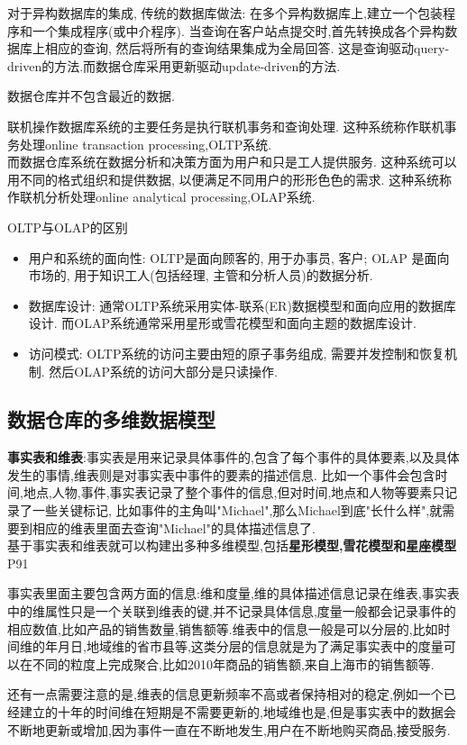 \documentclass{article}
\begin{document}
对于异构数据库的集成, 传统的数据库做法: 在多个异构数据库上,建立一个包装程序和一个集成程序(或中介程序). 当查询在客户站点提交时,首先转换成各个异构数据库上相应的查询, 然后将所有的查询结果集成为全局回答. 这是查询驱动query-driven的方法.而数据仓库采用更新驱动update-driven的方法.\par
数据仓库并不包含最近的数据.

联机操作数据库系统的主要任务是执行联机事务和查询处理. 这种系统称作联机事务处理online transaction processing,OLTP系统. \\
而数据仓库系统在数据分析和决策方面为用户和只是工人提供服务. 这种系统可以用不同的格式组织和提供数据, 以便满足不同用户的形形色色的需求. 这种系统称作联机分析处理online analytical processing,OLAP系统.\par
OLTP与OLAP的区别
\begin{itemize}
	\item 用户和系统的面向性: OLTP是面向顾客的, 用于办事员, 客户; OLAP 是面向市场的, 用于知识工人(包括经理, 主管和分析人员)的数据分析.
	\item 数据库设计: 通常OLTP系统采用实体-联系(ER)数据模型和面向应用的数据库设计. 而OLAP系统通常采用星形或雪花模型和面向主题的数据库设计.
	\item 访问模式: OLTP系统的访问主要由短的原子事务组成, 需要并发控制和恢复机制. 然后OLAP系统的访问大部分是只读操作.
\end{itemize}

\subsection{数据仓库的多维数据模型}
\textbf{事实表和维表}:事实表是用来记录具体事件的,包含了每个事件的具体要素,以及具体发生的事情,维表则是对事实表中事件的要素的描述信息.
比如一个事件会包含时间,地点,人物,事件,事实表记录了整个事件的信息,但对时间,地点和人物等要素只记录了一些关键标记,
比如事件的主角叫"Michael",那么Michael到底"长什么样",就需要到相应的维表里面去查询"Michael"的具体描述信息了.\\
基于事实表和维表就可以构建出多种多维模型,包括\textbf{星形模型,雪花模型和星座模型}P91

事实表里面主要包含两方面的信息:维和度量,维的具体描述信息记录在维表,事实表中的维属性只是一个关联到维表的键,并不记录具体信息,度量一般都会记录事件的相应数值,比如产品的销售数量,销售额等.维表中的信息一般是可以分层的,比如时间维的年月日,地域维的省市县等,这类分层的信息就是为了满足事实表中的度量可以在不同的粒度上完成聚合,比如2010年商品的销售额,来自上海市的销售额等.

还有一点需要注意的是,维表的信息更新频率不高或者保持相对的稳定,例如一个已经建立的十年的时间维在短期是不需要更新的,地域维也是,但是事实表中的数据会不断地更新或增加,因为事件一直在不断地发生,用户在不断地购买商品,接受服务.
\end{document}
